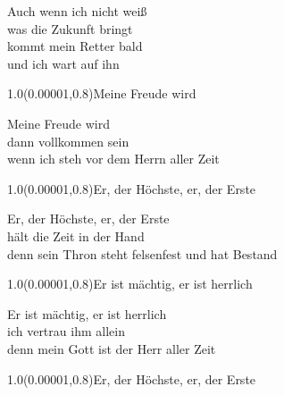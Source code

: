 \documentclass[aspectratio=169]{beamer}
\begin{document}
\begin{frame}
\centering
\color{white}
\huge{Auch wenn ich nicht weiß} \\
\huge{was die Zukunft bringt} \\
\huge{kommt mein Retter bald} \\
\huge{und ich wart auf ihn} \\

\begin{textblock}{1.0}(0.00001,0.8)\color{gray}\normalsize{Meine Freude wird}\end{textblock}
\end{frame}

\begin{frame}
\centering
\color{white}
\huge{Meine Freude wird} \\
\huge{dann vollkommen sein} \\
\huge{wenn ich steh vor dem Herrn aller Zeit} \\

\begin{textblock}{1.0}(0.00001,0.8)\color{gray}\normalsize{Er, der Höchste, er, der Erste}\end{textblock}
\end{frame}

\begin{frame}
\centering
\color{white}
\huge{Er, der Höchste, er, der Erste} \\
\huge{hält die Zeit in der Hand} \\
\huge{denn sein Thron steht felsenfest und hat Bestand} \\

\begin{textblock}{1.0}(0.00001,0.8)\color{gray}\normalsize{Er ist mächtig, er ist herrlich}\end{textblock}
\end{frame}

\begin{frame}
\centering
\color{white}
\huge{Er ist mächtig, er ist herrlich} \\
\huge{ich vertrau ihm allein} \\
\huge{denn mein Gott ist der Herr aller Zeit} \\

\begin{textblock}{1.0}(0.00001,0.8)\color{gray}\normalsize{Er, der Höchste, er, der Erste}\end{textblock}
\end{frame}
\end{document}
